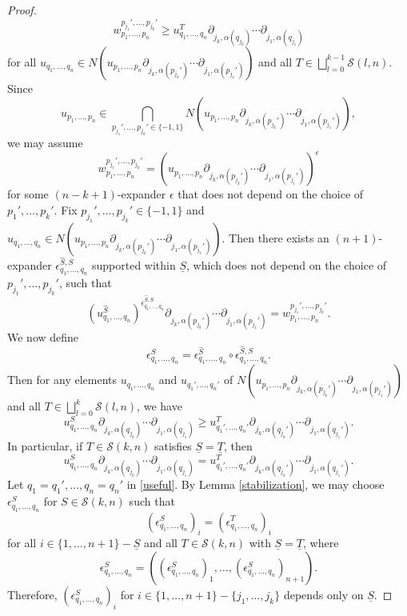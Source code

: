 \documentclass[oneside, 12pt]{amsart}
\numberwithin{equation}{section}
\theoremstyle{plain}
\theoremstyle{definition}
\theoremstyle{remark}
\begin{document}
\begin{proof}
		\[
		w_{p_1,\ldots,p_n}^{p_{j_1}',\ldots,p_{j_k}'}\ge u_{q_1,\ldots,q_n}^T\partial_{j_k,\alpha(q_{j_k})}\cdots\partial_{j_1,\alpha(q_{j_1})}
		\]
		for all $u_{q_1,\ldots,q_n}\in N(u_{p_1,\ldots,p_n}\partial_{j_k,\alpha(p_{j_k}')}\cdots\partial_{j_1,\alpha(p_{j_1}')})$ and all $T\in\bigsqcup_{l=0}^{k-1}\mathcal{S}(l,n)$. Since
		\[
		u_{p_1,\ldots,p_n}\in\bigcap_{p_{j_1}',\ldots,p_{j_k}'\in\{-1,1\}}N(u_{p_1,\ldots,p_n}\partial_{j_k,\alpha(p_{j_k}')}\cdots\partial_{j_1,\alpha(p_{j_1}')}),
		\]
		we may assume
		\[
		w_{p_1,\ldots,p_n}^{p_{j_1}',\ldots,p_{j_k}'}=(u_{p_1,\ldots,p_n}\partial_{j_k,\alpha(p_{j_k}')}\cdots\partial_{j_1,\alpha(p_{j_1}')})^\epsilon
		\]
		for some $(n-k+1)$-expander $\epsilon$ that does not depend on the choice of $p_1',\ldots,p_k'$. Fix $p_{j_1}',\ldots,p_{j_k}'\in\{-1,1\}$ and $u_{q_1,\ldots,q_n}\in N(u_{p_1,\ldots,p_n}\partial_{j_k,\alpha(p_{j_k}')}\cdots\partial_{j_1,\alpha(p_{j_1}')})$. Then there exists an $(n+1)$-expander $\epsilon_{q_1,\ldots,q_n}^{\widehat{S},S}$ supported within $\underline{S}$, which does not depend on the choice of $p_{j_1}',\ldots,p_{j_k}'$, such that
		\[
		(u_{q_1,\ldots,q_n}^{\widehat{S}})^{\epsilon_{q_1,\ldots,q_n}^{\widehat{S},S}}\partial_{j_k,\alpha(p_{j_k}')}\cdots\partial_{j_1,\alpha(p_{j_1}')}=w_{p_1,\ldots,p_n}^{p_{j_1}',\ldots,p_{j_k}'}.
		\]
		We now define
		\[
		\epsilon_{q_1,\ldots,q_n}^{S}=\epsilon_{q_1,\ldots,q_n}^{\widehat{S}}\circ\epsilon_{q_1,\ldots,q_n}^{\widehat{S},S}.
		\]
		Then for any elements $u_{q_1,\ldots,q_n}$ and $u_{q_1',\ldots,q_n'}$ of $N(u_{p_1,\ldots,p_n}\partial_{j_k,\alpha(p_{j_k}')}\cdots\partial_{j_1,\alpha(p_{j_1}')})$ and all $T\in\bigsqcup_{l=0}^{k}\mathcal{S}(l,n)$, we have
		\[
		u_{q_1,\ldots,q_n}^S\partial_{j_k,\alpha(q_{j_k})}\cdots\partial_{j_1,\alpha(q_{j_1})}\ge u_{q_1',\ldots,q_n'}^T\partial_{j_k,\alpha(q_{j_k}')}\cdots\partial_{j_1,\alpha(q_{j_1}')}.
		\]
		In particular, if $T\in\mathcal{S}(k,n)$ satisfies $\underline{S}=\underline{T}$, then
		\begin{equation}
			\label{useful}
			u_{q_1,\ldots,q_n}^S\partial_{j_k,\alpha(q_{j_k})}\cdots\partial_{j_1,\alpha(q_{j_1})}=u_{q_1',\ldots,q_n'}^T\partial_{j_k,\alpha(q_{j_k}')}\cdots\partial_{j_1,\alpha(q_{j_1}')}.
		\end{equation}
		Let $q_1=q_1',\ldots,q_n=q_n'$ in \eqref{useful}. By Lemma \ref{stabilization}, we may choose $\epsilon_{q_1,\ldots,q_n}^S$ for $S\in\mathcal{S}(k,n)$ such that
		\[
		(\epsilon_{q_1,\ldots,q_n}^S)_i=(\epsilon_{q_1,\ldots,q_n}^T)_i
		\]
		for all $i\in\{1,\ldots,n+1\}-\underline{S}$ and all $T\in\mathcal{S}(k,n)$ with $\underline{S}=\underline{T}$, where
		$$\epsilon_{q_1,\ldots,q_n}^S=((\epsilon_{q_1,\ldots,q_n}^S)_1,\ldots,(\epsilon_{q_1,\ldots,q_n}^S)_{n+1}).$$ 
		Therefore, $(\epsilon_{q_1,\ldots,q_n}^S)_i$ for $i\in\{1,\ldots,n+1\}-\{j_1,\ldots,j_k\}$ depends only on $\underline{S}$.
		

\end{proof}
\end{document}
